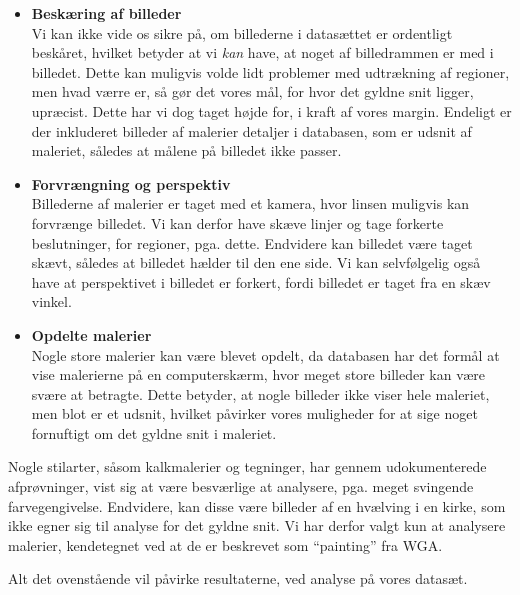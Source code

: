 {\begin{itemize}
    \item \textbf{Beskæring af billeder}\\
        Vi kan ikke vide os sikre på, om billederne i datasættet er
        ordentligt beskåret, hvilket betyder at vi \emph{kan} have, at
        noget af billedrammen er med i billedet. Dette kan muligvis
        volde lidt problemer med udtrækning af regioner, men hvad værre
        er, så gør det vores mål, for hvor det gyldne snit ligger,
        upræcist. Dette har vi dog taget højde for, i kraft af vores
        margin.  Endeligt er der inkluderet billeder af malerier
        detaljer i databasen, som er udsnit af maleriet, således at
        målene på billedet ikke passer.
    \item \textbf{Forvrængning og perspektiv}\\
        Billederne af malerier er taget med et kamera, hvor linsen muligvis kan
        forvrænge billedet. Vi kan derfor have skæve linjer og tage
        forkerte beslutninger, for regioner, pga. dette. Endvidere kan
        billedet være taget skævt, således at billedet hælder til den
        ene side. Vi kan selvfølgelig også have at perspektivet i
        billedet er forkert, fordi billedet er taget fra en skæv vinkel.
    \item \textbf{Opdelte malerier}\\
        Nogle store malerier kan være blevet opdelt, da databasen har
        det formål at vise malerierne på en computerskærm, hvor meget
        store billeder kan være svære at betragte. Dette betyder, at
        nogle billeder ikke viser hele maleriet, men blot er et udsnit,
        hvilket påvirker vores muligheder for at sige noget fornuftigt
        om det gyldne snit i maleriet.
\end{itemize}

Nogle stilarter, såsom kalkmalerier og tegninger, har gennem
udokumenterede afprøvninger, vist sig at være besværlige at analysere,
pga. meget svingende farvegengivelse. Endvidere, kan disse være billeder
af en hvælving i en kirke, som ikke egner sig til analyse for det gyldne
snit. Vi har derfor valgt kun at analysere malerier, kendetegnet ved at
de er beskrevet som ``painting'' fra WGA.

Alt det ovenstående vil påvirke resultaterne, ved analyse på vores
datasæt.

}
